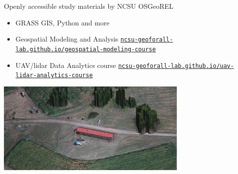\documentclass[xcolor={dvipsnames,usenames},beamer,aspectratio=169]{beamer}
\begin{document}
\begin{frame}{Openly accessible study materials by NCSU OSGeoREL}

\begin{itemize}
  \item GRASS GIS, Python and more
  \item Geospatial Modeling and Analysis
    {\tiny\href{http://ncsu-geoforall-lab.github.io/geospatial-modeling-course/}{\texttt{ncsu-geoforall-lab.github.io/geospatial-modeling-course}}}
  \item UAV/lidar Data Analytics course
    {\tiny\href{http://ncsu-geoforall-lab.github.io/uav-lidar-analytics-course/}{\texttt{ncsu-geoforall-lab.github.io/uav-lidar-analytics-course}}}
\end{itemize}

\centering
\includegraphics[width=0.7\textwidth]{agisoft_detail}%

\end{frame}
\end{document}
